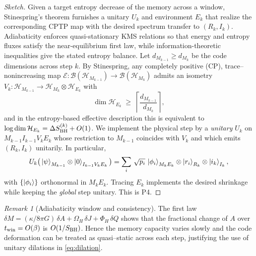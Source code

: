 \documentclass[a4paper,11pt]{article}
\theoremstyle{plain}
\theoremstyle{definition}
\theoremstyle{remark}
\newtheorem{remark}{Remark}
\begin{document}
\begin{proof}[Sketch]
Given a target entropy decrease of the memory across a window, Stinespring's theorem furnishes a unitary $U_k$ and environment $E_k$
that realize the corresponding CPTP map with the desired spectrum transfer to $(R_k,I_k)$. Adiabaticity enforces quasi-stationary KMS
relations so that energy and entropy fluxes satisfy the near-equilibrium first law, while information-theoretic inequalities give the
stated entropy balance.
Let $d_{M_{k-1}}\ge d_{M_k}$ be the code dimensions across step $k$. By Stinespring, any completely positive (CP), trace--nonincreasing map $\mathcal{E}:\mathcal{B}(\mathcal{H}_{M_{k-1}})\to\mathcal{B}(\mathcal{H}_{M_k})$ admits an isometry $V_k:\mathcal{H}_{M_{k-1}}\to\mathcal{H}_{M_k}\otimes\mathcal{H}_{E_k}$ with
\[
\dim\mathcal{H}_{E_k}\;\ge\;\left\lceil \frac{d_{M_{k-1}}}{d_{M_k}} \right\rceil,
\]
and in the entropy-based effective description this is equivalent to $\log \dim\mathcal{H}_{E_k}=\Delta S_{\rm BH}^{(k)}+O(1)$. We implement the physical step by a \emph{unitary} $U_k$ on $M_{k-1}I_{k-1}V_kE_k$ whose restriction to $M_{k-1}$ coincides with $V_k$ and which emits $(R_k,I_k)$ unitarily. In particular,
\begin{equation}
\label{eq:dilation}
U_k\big(\left|\psi\right\rangle_{M_{k-1}}\otimes\left|0\right\rangle_{I_{k-1}V_kE_k}\big)
=\sum_{i}\,\sqrt{p_i}\,\left|\phi_i\right\rangle_{M_k E_k}\otimes\left|r_i\right\rangle_{R_k}\otimes\left|i_k\right\rangle_{I_k},
\end{equation}
with $\{\left|\phi_i\right\rangle\}$ orthonormal in $M_kE_k$. Tracing $E_k$ implements the desired shrinkage while keeping the \emph{global} step unitary. This is P4.
\end{proof}

\begin{remark}[Adiabaticity window and consistency]\label{rem:adiabaticity_window}
The first law $\delta M=(\kappa/8\pi G)\,\delta A + \Omega_H\,\delta J+\Phi_H\,\delta Q$ shows that the fractional change of $A$ over $t_{\rm win}=O(\beta)$ is $O(1/S_{\rm BH})$. Hence the memory capacity varies slowly and the code deformation can be treated as quasi--static across each step, justifying the use of unitary dilations in \eqref{eq:dilation}.
\end{remark}
\end{document}
